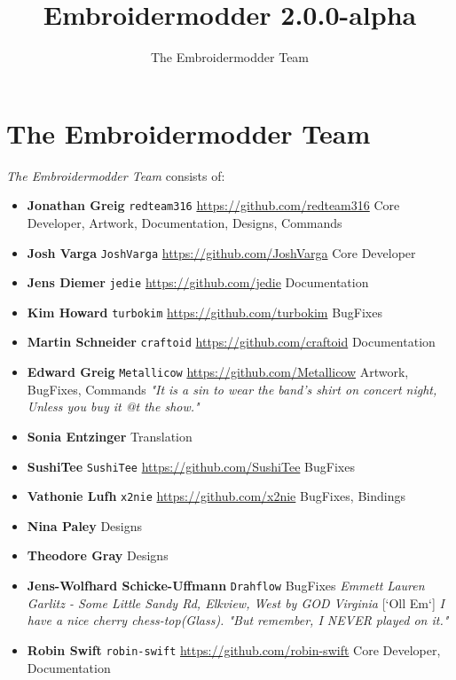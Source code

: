 \documentclass{report}
\title{Embroidermodder 2.0.0-alpha}
\author{The Embroidermodder Team}
\begin{document}
\maketitle

\tableofcontents

\pagebreak

\section*{The Embroidermodder Team}

\emph{The Embroidermodder Team} consists of:

\begin{itemize}
\item \textbf{Jonathan Greig} \texttt{redteam316} \url{https://github.com/redteam316} Core Developer, Artwork, Documentation, Designs, Commands
\item \textbf{Josh Varga} \texttt{JoshVarga} \url{https://github.com/JoshVarga} Core Developer
\item \textbf{Jens Diemer} \texttt{jedie} \url{https://github.com/jedie} Documentation
\item \textbf{Kim Howard} \texttt{turbokim} \url{https://github.com/turbokim} BugFixes
\item \textbf{Martin Schneider} \texttt{craftoid} \url{https://github.com/craftoid} Documentation
\item \textbf{Edward Greig} \texttt{Metallicow} \url{https://github.com/Metallicow} Artwork, BugFixes, Commands \emph{"It is a sin to wear the band's shirt on concert night, Unless you buy it @t the show."}
\item \textbf{Sonia Entzinger} Translation
\item \textbf{SushiTee} \texttt{SushiTee} \url{https://github.com/SushiTee} BugFixes
\item \textbf{Vathonie Lufh} \texttt{x2nie} \url{https://github.com/x2nie} BugFixes, Bindings
\item \textbf{Nina Paley} Designs
\item \textbf{Theodore Gray} Designs
\item \textbf{Jens-Wolfhard Schicke-Uffmann} \texttt{Drahflow} BugFixes
 \emph{Emmett Lauren Garlitz - Some Little Sandy Rd, Elkview, West by GOD Virginia} [`Oll Em`] \emph{I have a nice cherry chess-top(Glass). "But remember, I NEVER played on it."}
\item \textbf{Robin Swift} \texttt{robin-swift} \url{https://github.com/robin-swift} Core Developer, Documentation
\end{itemize}
\end{document}
